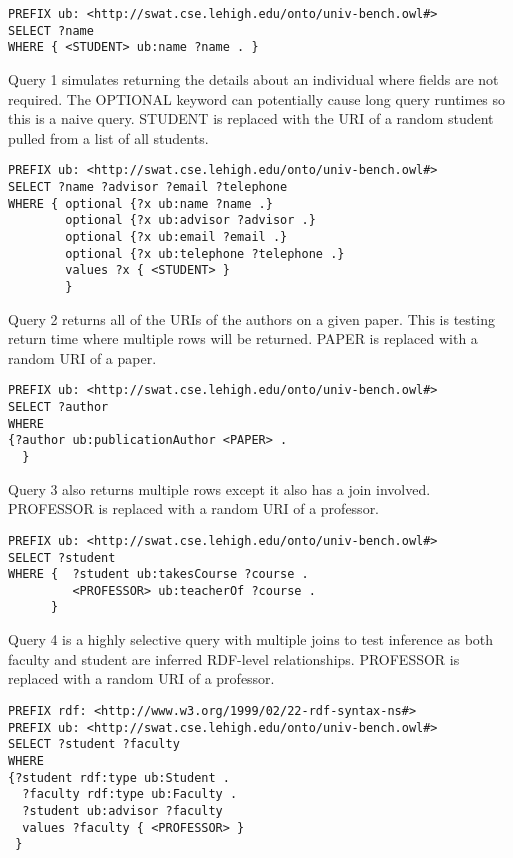 \documentclass{llncs}
\begin{document}
\begin{lstlisting}[caption=Benchmark Query]
PREFIX ub: <http://swat.cse.lehigh.edu/onto/univ-bench.owl#>
SELECT ?name
WHERE { <STUDENT> ub:name ?name . }
\end{lstlisting}

\smallskip

Query 1 simulates returning the details about an individual where fields are not required.  The OPTIONAL keyword can potentially cause long query runtimes so this is a naive query.  STUDENT is replaced with the URI of a random student pulled from a list of all students.

\begin{lstlisting}[caption=Query 1]
PREFIX ub: <http://swat.cse.lehigh.edu/onto/univ-bench.owl#>
SELECT ?name ?advisor ?email ?telephone
WHERE { optional {?x ub:name ?name .}
        optional {?x ub:advisor ?advisor .}
        optional {?x ub:email ?email .}
        optional {?x ub:telephone ?telephone .}
        values ?x { <STUDENT> }
        }
\end{lstlisting}

\smallskip

Query 2 returns all of the URIs of the authors on a given paper.  This is testing return time where multiple rows will be returned.  PAPER is replaced with a random URI of a paper.

\begin{lstlisting}[caption=Query 2]
PREFIX ub: <http://swat.cse.lehigh.edu/onto/univ-bench.owl#>
SELECT ?author
WHERE
{?author ub:publicationAuthor <PAPER> .
  }
\end{lstlisting}
\smallskip

Query 3 also returns multiple rows except it also has a join involved.  PROFESSOR is replaced with a random URI of a professor.

\begin{lstlisting}[caption=Query 3]
PREFIX ub: <http://swat.cse.lehigh.edu/onto/univ-bench.owl#>
SELECT ?student
WHERE {  ?student ub:takesCourse ?course .
         <PROFESSOR> ub:teacherOf ?course .
      }
\end{lstlisting}

\smallskip

Query 4 is a highly selective query with multiple joins to test inference as both faculty and student are inferred RDF-level relationships.  PROFESSOR is replaced with a random URI of a professor.

\begin{lstlisting}[caption=Query 4]
PREFIX rdf: <http://www.w3.org/1999/02/22-rdf-syntax-ns#>
PREFIX ub: <http://swat.cse.lehigh.edu/onto/univ-bench.owl#>
SELECT ?student ?faculty
WHERE
{?student rdf:type ub:Student .
  ?faculty rdf:type ub:Faculty .
  ?student ub:advisor ?faculty 
  values ?faculty { <PROFESSOR> }
 }
\end{lstlisting}
\clearpage
\end{document}
